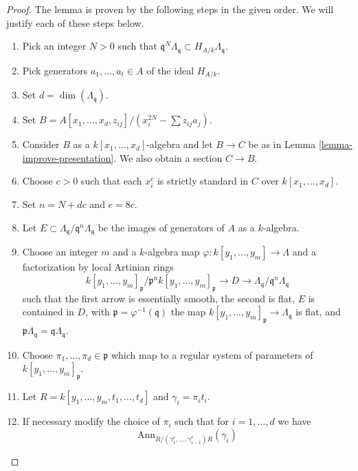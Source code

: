 \begin{proof}
The lemma is proven by the following steps in the given order.
We will justify each of these steps below.
\begin{enumerate}
\item
\label{item-power}
Pick an integer $N > 0$ such that
$\mathfrak q^N\Lambda_\mathfrak q \subset H_{A/k}\Lambda_\mathfrak q$.
\item
\label{item-generators}
Pick generators $a_1, \ldots, a_t \in A$ of the ideal $H_{A/k}$.
\item
\label{item-dimension}
Set $d = \dim(\Lambda_\mathfrak q)$.
\item
\label{item-standardizer}
Set $B = A[x_1, \ldots, x_d, z_{ij}]/(x_i^{2N} - \sum z_{ij}a_j)$.
\item
\label{item-elkik}
Consider $B$ as a $k[x_1, \ldots, x_d]$-algebra and let
$B \to C$ be as in
Lemma \ref{lemma-improve-presentation}.
We also obtain a section $C \to B$.
\item
\label{item-strictly-standard}
Choose $c > 0$ such that each $x_i^c$
is strictly standard in $C$ over $k[x_1, \ldots, x_d]$.
\item
\label{item-set-n}
Set $n = N + dc$ and $e = 8c$.
\item
\label{item-set-E}
Let $E \subset \Lambda_\mathfrak q/\mathfrak q^n\Lambda_\mathfrak q$
be the images of generators of $A$ as a $k$-algebra.
\item
\label{item-NP}
Choose an integer $m$ and a $k$-algebra map
$\varphi : k[y_1, \ldots, y_m] \to \Lambda$
and a factorization by local Artinian rings
$$
k[y_1, \ldots, y_m]_\mathfrak p/\mathfrak p^n k[y_1, \ldots, y_m]_\mathfrak p
\to D \to
\Lambda_\mathfrak q/\mathfrak q^n\Lambda_\mathfrak q
$$
such that the first arrow is essentially smooth, the second is flat,
$E$ is contained in $D$, with $\mathfrak p = \varphi^{-1}(\mathfrak q)$
the map $k[y_1, \ldots, y_m]_\mathfrak p \to \Lambda_\mathfrak q$ is
flat, and $\mathfrak p \Lambda_\mathfrak q = \mathfrak q \Lambda_\mathfrak q$.
\item
\label{item-choose-pii}
Choose $\pi_1, \ldots, \pi_d \in \mathfrak p$ which map to a
regular system of parameters of $k[y_1, \ldots, y_m]_\mathfrak p$.
\item
\label{item-set-R}
Let $R = k[y_1, \ldots, y_m, t_1, \ldots, t_d]$ and $\gamma_i = \pi_i t_i$.
\item
\label{item-modify-pii}
If necessary modify the choice of $\pi_i$ such that
for $i = 1, \ldots, d$ we have 
$$
\text{Ann}_{R/(\gamma_1^e, \ldots, \gamma_{i - 1}^e)R}(\gamma_i)
$$
\end{enumerate}
\end{proof}
